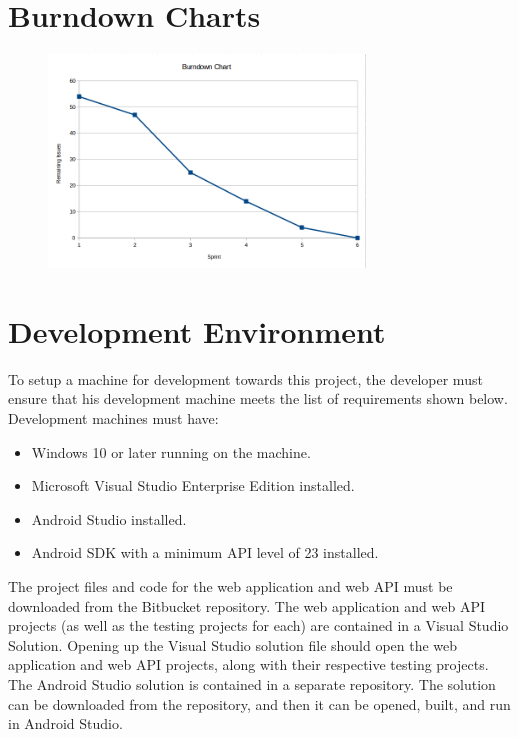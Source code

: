 \section{Burndown Charts}
\begin{figure}[tbh]
\begin{center}
\includegraphics[width=0.75\textwidth]{./Burndown.png}
\end{center}
\label{BurndownChart}
\end{figure}

\section{Development Environment}
To setup a machine for development towards this project, the developer must ensure that his development machine meets the list of requirements shown below. Development machines must have:

\begin{itemize}
\item Windows 10 or later running on the machine.
\item Microsoft Visual Studio Enterprise Edition installed.
\item Android Studio installed.
\item Android SDK with a minimum API level of 23 installed.
\end{itemize}

\noindent The project files and code for the web application and web API must be downloaded from the Bitbucket repository. The web application and web API projects (as well as the testing projects for each) are contained in a Visual Studio Solution. Opening up the Visual Studio solution file should open the web application and web API projects, along with their respective testing projects.\\ 

\noindent The Android Studio solution is contained in a separate repository. The solution can be downloaded from the repository, and then it can be opened, built, and run in Android Studio.

